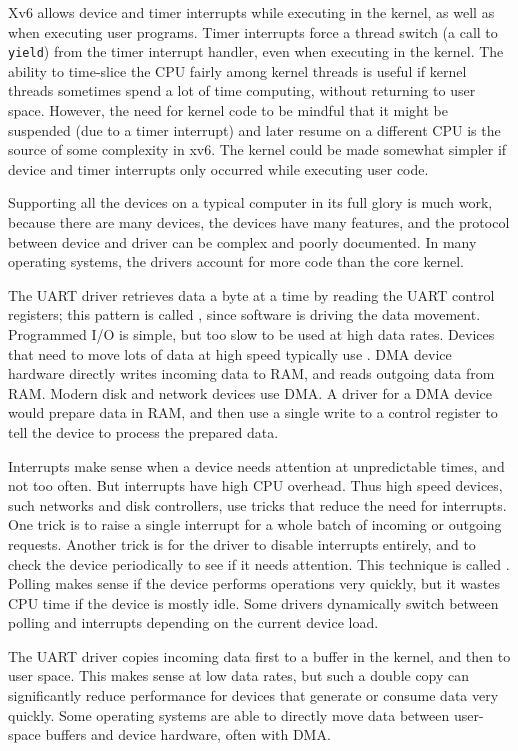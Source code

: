 Xv6 allows device and timer interrupts while executing in the kernel,
as well as when executing user programs. Timer interrupts force a
thread switch (a call to {\tt yield}) from the timer interrupt
handler, even when executing in the kernel. The ability to time-slice
the CPU fairly among kernel threads is useful if kernel threads
sometimes spend a lot of time computing, without returning to user
space. However, the need for kernel code to be mindful that it might
be suspended (due to a timer interrupt) and later resume on a
different CPU is the source of some complexity in xv6. The kernel
could be made somewhat simpler if device and timer interrupts only
occurred while executing user code.

Supporting all the devices on a typical computer in its full glory is
much work, because there are many devices, the devices have many
features, and the protocol between device and driver can be complex
and poorly documented. In many operating systems, the drivers account
for more code than the core kernel.

The UART driver retrieves data a byte at a time by reading the UART
control registers; this pattern is called , since
software is driving the data movement. Programmed I/O is simple, but
too slow to be used at high data rates. Devices that need to move lots
of data at high speed typically use .
DMA device hardware directly writes incoming data to RAM, and reads
outgoing data from RAM. Modern disk and network devices use DMA. A
driver for a DMA device would prepare data in RAM, and then use a
single write to a control register to tell the device to process the
prepared data.

Interrupts make sense when a device needs attention at unpredictable
times, and not too often. But interrupts have high CPU overhead. Thus
high speed devices, such networks and disk controllers, use tricks
that reduce the need for interrupts. One trick is to raise a single
interrupt for a whole batch of incoming or outgoing requests. Another
trick is for the driver to disable interrupts entirely, and to check
the device periodically to see if it needs attention. This technique
is called . Polling makes sense if the device performs
operations very quickly, but it wastes CPU time if the device is mostly
idle. Some drivers dynamically switch between polling and interrupts
depending on the current device load.

The UART driver copies incoming data first to a buffer in the kernel,
and then to user space. This makes sense at low data rates, but such a
double copy can significantly reduce performance for devices that
generate or consume data very quickly. Some operating systems are able
to directly move data between user-space buffers and device hardware,
often with DMA.

